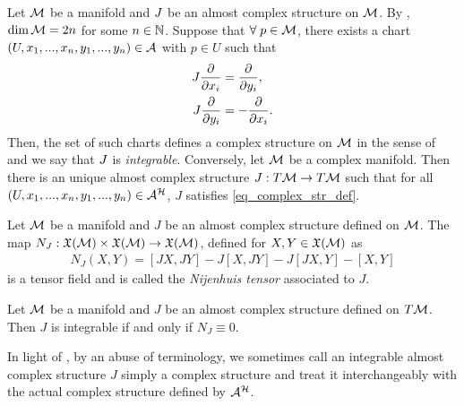 \documentclass[notas.tex]{subfiles}
\begin{document}
\begin{prop} \label{prop_cstruct_integrable}
	Let $\mathcal{M}$ be a manifold and $J$ be an almost complex structure on $\mathcal{M}$. By , $\dim \mathcal{M} = 2n$ for some $n \in \mathbb{N}$. Suppose that $\forall p \in \mfld$, there exists a chart $(U, x_1,...,x_n,y_1,...,y_n) \in \mathcal{A}$ with $p \in U$ such that
	\begin{align} \label{eq_complex_str_def}
		J \frac{\partial }{\partial x_i} &= \frac{\partial }{\partial y_i}, \\
		J \frac{\partial }{\partial y_i} &= - \frac{\partial }{\partial x_i}. \nonumber
	\end{align}
	Then, the set of such charts defines a complex structure on $\mathcal{M}$ in the sense of  and we say that $J$ is \emph{integrable}.
	Conversely, let $\mathcal{M}$ be a complex manifold. Then there is an unique almost complex structure $J: T\mathcal{M} \to T\mathcal{M}$ such that for all $(U, x_1,...,x_n,y_1,...,y_n) \in \mathcal{A}^{\mathcal{H}}$, $J$ satisfies \eqref{eq_complex_str_def}.
\end{prop}
\begin{prop}
	Let $\mathcal{M}$ be a manifold and $J$ be an almost complex structure defined on $\mathcal{M}$. The map $N_J : \mathfrak{X}(\mathcal{M}) \times \mathfrak{X}(\mathcal{M}) \to \mathfrak{X}(\mathcal{M})$, defined for $X,Y \in \mathfrak{X}(\mathcal{M})$ as
	\begin{align*}
		N_J(X,Y) = [JX,JY] - J[X,JY] - J[JX,Y] - [X,Y]
	\end{align*}
	is a tensor field and is called the \emph{Nijenhuis tensor} associated to $J$.
\end{prop}
\begin{thm}
	Let $\mathcal{M}$ be a manifold and $J$ be an almost complex structure defined on $T \mathcal{M}$. Then  $J$ is integrable if and only if $N_J \equiv 0$.
\end{thm}

In light of , by an abuse of terminology, we sometimes call an integrable almost complex structure $J$ simply a complex structure and treat it interchangeably with the actual complex structure defined by $\mathcal{A}^{\mathcal{H}}$.

\end{document}
